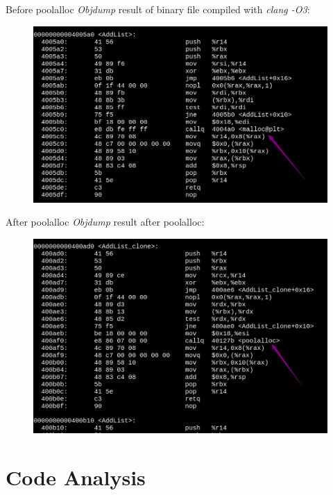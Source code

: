 \documentclass{beamer}
\begin{document}
\begin{frame}{Before poolalloc}
\emph{Objdump} result of binary file compiled with \emph{clang -O3}:
  \begin{figure}[H]
	\centering
	\includegraphics[scale = 0.3]{./fig/nopool.png}
  \end{figure}
\end{frame}

\begin{frame}{After poolalloc}
  \emph{Objdump} result after poolalloc:
  \begin{figure}[H]
	\centering
	\includegraphics[scale = 0.3]{./fig/pool.png}
  \end{figure}
\end{frame}

\section{Code Analysis}
\end{document}
